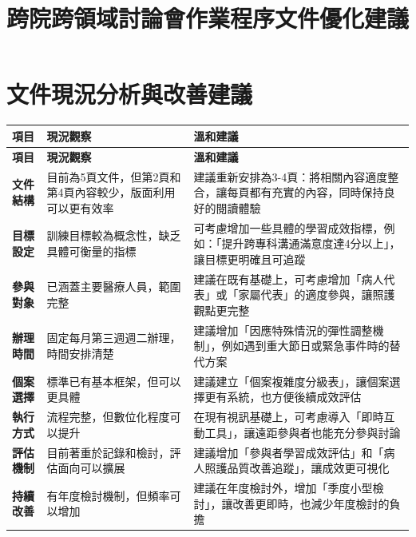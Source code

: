 \documentclass{article}
\begin{document}
\title{\textbf{跨院跨領域討論會作業程序文件優化建議}}
\author{}
\date{}
\maketitle

\section*{文件現況分析與改善建議}

\begin{longtable}{|>{\centering\arraybackslash}p{3cm}|>{\raggedright\arraybackslash}p{5cm}|>{\raggedright\arraybackslash}p{6cm}|}
\hline
\rowcolor{lightgray}
\textbf{項目} & \textbf{現況觀察} & \textbf{溫和建議} \\
\hline
\endfirsthead

\hline
\rowcolor{lightgray}
\textbf{項目} & \textbf{現況觀察} & \textbf{溫和建議} \\
\hline
\endhead

\hline
\endfoot

\hline
\endlastfoot

\textbf{文件結構} & 
目前為5頁文件，但第2頁和第4頁內容較少，版面利用可以更有效率 & 
建議重新安排為3-4頁：將相關內容適度整合，讓每頁都有充實的內容，同時保持良好的閱讀體驗 \\
\hline

\textbf{目標設定} & 
訓練目標較為概念性，缺乏具體可衡量的指標 & 
可考慮增加一些具體的學習成效指標，例如：「提升跨專科溝通滿意度達4分以上」，讓目標更明確且可追蹤 \\
\hline

\textbf{參與對象} & 
已涵蓋主要醫療人員，範圍完整 & 
建議在既有基礎上，可考慮增加「病人代表」或「家屬代表」的適度參與，讓照護觀點更完整 \\
\hline

\textbf{辦理時間} & 
固定每月第三週週二辦理，時間安排清楚 & 
建議增加「因應特殊情況的彈性調整機制」，例如遇到重大節日或緊急事件時的替代方案 \\
\hline

\textbf{個案選擇} & 
標準已有基本框架，但可以更具體 & 
建議建立「個案複雜度分級表」，讓個案選擇更有系統，也方便後續成效評估 \\
\hline

\textbf{執行方式} & 
流程完整，但數位化程度可以提升 & 
在現有視訊基礎上，可考慮導入「即時互動工具」，讓遠距參與者也能充分參與討論 \\
\hline

\textbf{評估機制} & 
目前著重於記錄和檢討，評估面向可以擴展 & 
建議增加「參與者學習成效評估」和「病人照護品質改善追蹤」，讓成效更可視化 \\
\hline

\textbf{持續改善} & 
有年度檢討機制，但頻率可以增加 & 
建議在年度檢討外，增加「季度小型檢討」，讓改善更即時，也減少年度檢討的負擔 \\
\hline

\end{longtable}
\end{document}
